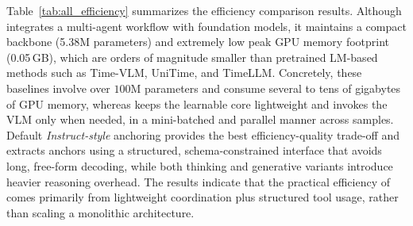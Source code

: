 Table~\ref{tab:all_efficiency} summarizes the efficiency comparison results. Although \model integrates a multi-agent workflow with foundation models, it maintains a compact backbone (5.38M parameters) and extremely low peak GPU memory footprint (0.05\,GB), which are orders of magnitude smaller than pretrained LM-based methods such as Time-VLM, UniTime, and TimeLLM. Concretely, these baselines involve over $100$M parameters and consume several to tens of gigabytes of GPU memory, whereas \model keeps the learnable core lightweight and invokes the VLM only when needed, in a mini-batched and parallel manner across samples. Default \textit{Instruct-style} anchoring provides the best efficiency-quality trade-off and extracts anchors using a structured, schema-constrained interface that avoids long, free-form decoding, while both thinking and generative variants introduce heavier reasoning overhead.
The results indicate that the practical efficiency of \model comes primarily from lightweight coordination plus structured tool usage, rather than scaling a monolithic architecture.